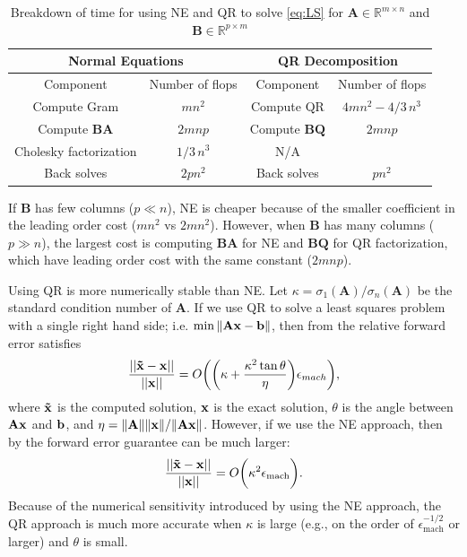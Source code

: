 \documentclass{article}
\newcommand{\mat}[1]{\mathbf{#1}}
\newcommand{\V}[2][]{\bm{#1{\mathbf{\MakeLowercase{#2}}}}} 		%
\begin{document}
\begin{table}[!ht]
  \centering
  \begin{tabular}{|c|c|c|c|}
    \hline
    \multicolumn{2}{|c|}{\textbf{Normal Equations}} & \multicolumn{2}{c|}{\textbf{QR Decomposition}} \\
    \hline
    Component & Number of flops & Component & Number of flops\\
    \hline
    Compute Gram & $mn^2$ & Compute QR & $4mn^2 - 4/3 \, n^3$\\
    Compute $\mat{B}\mat{A}$ & $2mnp$ & Compute $\mat{B}\mat{Q}$ & $2mnp$\\
    Cholesky factorization & $1/3 \, n^3$  & N/A & \\
    Back solves & $2pn^2$  & Back solves & $pn^2$  \\
    \hline
  \end{tabular}
  \caption{Breakdown of time for using NE and QR to solve \cref{eq:LS} for $\mat{A} \in \mathbb{R}^{m \times n}$ and $\mat{B} \in \mathbb{R}^{p \times m}$}
  \label{tab:QR-NE-time}
\end{table}


If $\mat{B}$ has few columns ($p\ll n$), NE is cheaper because of the smaller coefficient in the leading order cost ($mn^2$ vs $2mn^2$). 
However, when $\mat{B}$ has many columns ($p\gg n$), the largest cost is computing $\mat{B}\mat{A}$ for NE and $\mat{B}\mat{Q}$ for QR factorization, which have leading order cost with the same constant ($2mnp$).

Using QR is more numerically stable than NE. 
Let $\kappa = \sigma_1(\mat{A})/\sigma_n(\mat{A})$ be the standard condition number of $\mat{A}$.
If we use QR to solve a least squares problem with a single right hand side; i.e. $\min\|\mat{A}\V{x} - \V{b} \|$, then from \cite[Eq. (19.2)]{trefethen1997numerical} the relative forward error satisfies
\begin{equation}\label{eq:ne-ferr}
  \frac{||\V[\tilde]{x} - \V{x}||}{||\V{x}||} = O \biggl(\biggl(\kappa + \frac{\kappa^2\tan\theta}{\eta}\biggr)\epsilon_{mach}\biggr),
\end{equation}
where $\V[\tilde]{x}$ is the computed solution, $\V{x}$ is the exact solution, $\theta$ is the angle between $\mat{A}\V{x}$ and $\V{b}$, and $\eta = \|\mat{A}\|\|\V{x}\|/\|\mat{A}\V{x}\|$.
However, if we use the NE approach, then by \cite[Eq. (19.3)]{trefethen1997numerical} the forward error guarantee can be much larger: 
\begin{equation}\label{eq:qr-ferr}
  \frac{||\V[\tilde]{x} - \V{x}||}{||\V{x}||} = O \biggl(\kappa^2 \epsilon_{\text{mach}}\biggr).
\end{equation}
Because of the numerical sensitivity introduced by using the NE approach, the QR approach is much more accurate when $\kappa$ is large (e.g., on the order of $\epsilon_{\text{mach}}^{-1/2}$ or larger) and $\theta$ is small.
\end{document}
